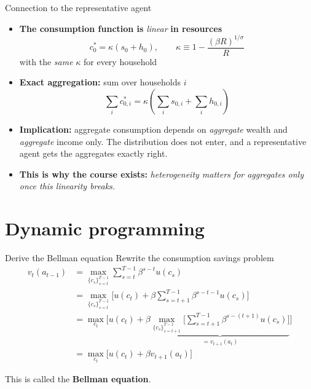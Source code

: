 \documentclass[
  10pt,
  ignorenonframetext,
  aspectratio=43,
  english,
  handout]{beamer}
\begin{document}
\begin{frame}{Connection to the representative agent}
\protect{}\label{connection-to-the-representative-agent}
\begin{itemize}
\item
  \textbf{The consumption function is} \emph{linear} \textbf{in
  resources} \[
    c^{\ast}_{0}=\kappa\left(s_{0}+h_{0}\right),\qquad\kappa\equiv1-\frac{(\beta R)^{1/\sigma}}{R}
    \] with the \emph{same} \(\kappa\) for every household
\item
  \textbf{Exact aggregation:} sum over households \(i\)
  \[ \sum_{i}c^{\ast}_{0,i}=\kappa\left(\sum_{i}s_{0,i}+\sum_{i}h_{0,i}\right)
    \]
\item
  \textbf{Implication:} aggregate consumption depends on
  \emph{aggregate} wealth and \emph{aggregate} income only. The
  distribution does not enter, and a representative agent gets the
  aggregates exactly right.
\item
  \textbf{This is why the course exists:} \emph{heterogeneity matters
  for aggregates only once this linearity breaks.}
\end{itemize}
\end{frame}

\section{Dynamic programming}\label{dynamic-programming}

\begin{frame}{Derive the Bellman equation}
\protect{}\label{derive-the-bellman-equation}
Rewrite the consumption savings problem \[
\begin{aligned}
    v_{t}(a_{t-1}) &= \max_{\{c_{s}\}_{s=t}^{T-1}} \sum_{s=t}^{T-1} \beta^{s-t} u(c_{s}) \\
    &= \max_{\{c_{s}\}_{s=t}^{T-1}} \Big[ u(c_{t}) + \beta \sum_{s=t+1}^{T-1}  \beta^{s-t-1} u(c_{s})\Big] \\
    &= \max_{c_{t}} \Bigg[ u(c_{t}) + \beta \underbrace{\max_{\{c_{s}\}_{s=t+1}^{T-1}}\Big[ \sum_{s=t+1}^{T-1}  \beta^{s-(t+1)} u(c_{s})\Big]}_{=v_{t+1}(a_{t})} \Bigg]  \\
    &= \max_{c_{t}} \Big[ u(c_{t})+\beta v_{t+1}(a_{t})\Big]
\end{aligned}
\]

This is called the \textbf{Bellman equation}.
\end{frame}
\end{document}
